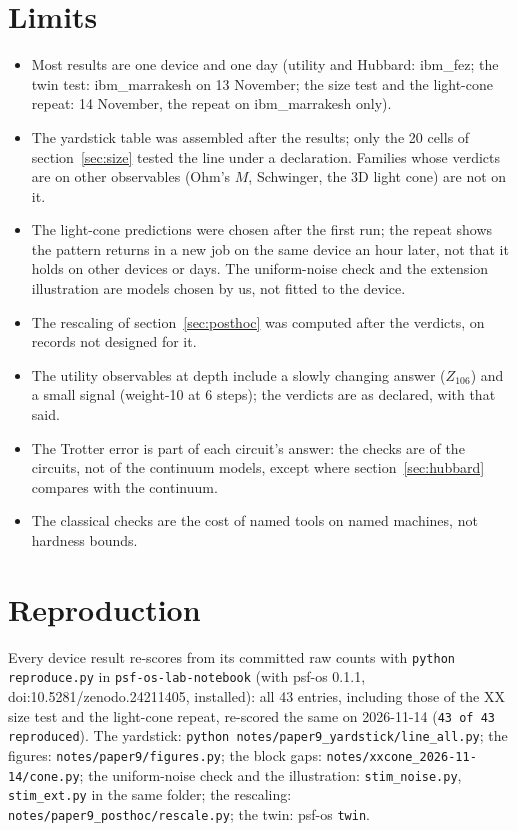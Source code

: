 \documentclass[10pt,a4paper]{article}
\begin{document}
\section{Limits}\label{sec:limits}
\begin{itemize}
\item Most results are one device and one day (utility and Hubbard: ibm\_fez; the twin test: ibm\_marrakesh on 13
November; the size test and the light-cone repeat: 14 November, the repeat on ibm\_marrakesh only).
\item The yardstick table was assembled after the results; only the 20 cells of section~\ref{sec:size} tested the line
under a declaration. Families whose verdicts are on other observables (Ohm's $M$, Schwinger, the 3D light cone) are not
on it.
\item The light-cone predictions were chosen after the first run; the repeat shows the pattern returns in a new job on
the same device an hour later, not that it holds on other devices or days. The uniform-noise check and the extension
illustration are models chosen by us, not fitted to the device.
\item The rescaling of section~\ref{sec:posthoc} was computed after the verdicts, on records not designed for it.
\item The utility observables at depth include a slowly changing answer ($Z_{106}$) and a small signal (weight-10 at 6
steps); the verdicts are as declared, with that said.
\item The Trotter error is part of each circuit's answer: the checks are of the circuits, not of the continuum models,
except where section~\ref{sec:hubbard} compares with the continuum.
\item The classical checks are the cost of named tools on named machines, not hardness bounds.
\end{itemize}

\section{Reproduction}\label{sec:repro}
Every device result re-scores from its committed raw counts with \texttt{python reproduce.py} in
\texttt{psf-os-lab-notebook} (with psf-os 0.1.1, doi:10.5281/zenodo.24211405, installed): all 43 entries, including those of the XX size test and the light-cone repeat, re-scored the same on 2026-11-14 (\texttt{43 of 43 reproduced}). The yardstick:
\texttt{python notes/paper9\_yardstick/line\_all.py}; the figures: \texttt{notes/paper9/figures.py}; the block gaps:
\texttt{notes/xxcone\_2026-11-14/cone.py}; the uniform-noise check and the illustration:
\texttt{stim\_noise.py}, \texttt{stim\_ext.py} in the same folder; the rescaling: \texttt{notes/paper9\_posthoc/rescale.py};
the twin: psf-os \texttt{twin}.
\end{document}
